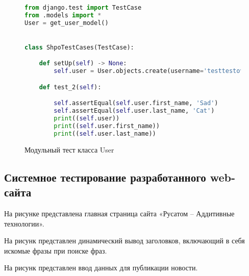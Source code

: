\begin{figure}[ht]
\begin{lstlisting}[language=Python]
from django.test import TestCase
from .models import *
User = get_user_model()


class ShpoTestCases(TestCase):

    def setUp(self) -> None:
        self.user = User.objects.create(username='testtestovich', password='testtestovich', first_name='Sad', last_name='')

    def test_2(self):

        self.assertEqual(self.user.first_name, 'Sad')
        self.assertEqual(self.user.last_name, 'Cat')
        print((self.user))
        print((self.user.first_name))
        print((self.user.last_name))
\end{lstlisting}  
\caption{Модульный тест класса User}
\label{unitUser:image}
\end{figure}

\subsection{Системное тестирование разработанного web-сайта}

На рисунке  представлена главная страница сайта «Русатом – Аддитивные технологии».
\newpage %


На рисунк представлен динамический вывод заголовков, включающий в себя искомые фразы при поиске фраз.


На рисунк представлен ввод данных для публикации новости.

